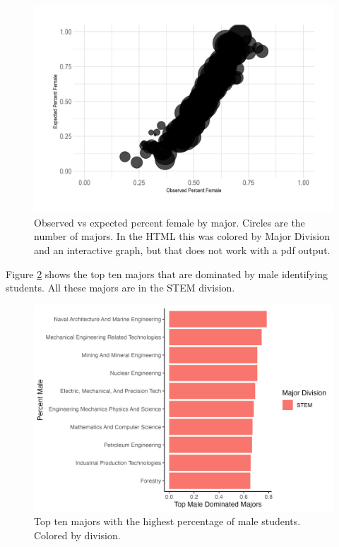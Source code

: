 \documentclass{article}
\begin{document}
\begin{figure}

{\centering \includegraphics[width=0.9\linewidth]{obs_vs_exp_gxm_major_size} 

}

\caption{Observed vs expected percent female by major. Circles are the number of majors. In the HTML this was colored by Major Division and an interactive graph, but that does not work with a pdf output.}\label{fig:obsvsexpmajorsizegraph}
\end{figure}

Figure \ref{fig:maledomgraph} shows the top ten majors that are dominated by male identifying students. All these majors are in the STEM division.



\begin{figure}

{\centering \includegraphics[width=0.9\linewidth]{male_dom} 

}

\caption{Top ten majors with the highest percentage of male students. Colored by division.}\label{fig:maledomgraph}
\end{figure}
\end{document}
